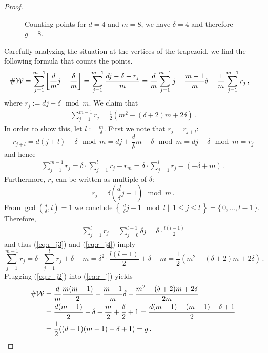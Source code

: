 \documentclass[main.tex]{subfiles}
\begin{document}
\begin{proof}
      \begin{figure}[H]
      \begin{center}
	  
      \end{center}
    \caption{Counting points for $d =4$ and $m = 8$, we have $\delta = 4$ and therefore $g = 8$.} 
    \label{fig:holom_diff}
\end{figure}
     Carefully analyzing the situation at the vertices of the trapezoid, we find the following formula that counts the points.
     \begin{align}\label{eq:r_j}
	\#\W & = \sum_{j = 1}^{m-1} \floor*{\frac{d}{m}j - \frac{\delta}{m}} = \sum_{j = 1}^{m-1} \frac{dj-\delta-r_j}{m} =
	 \frac{d}{m} \sum_{j=1}^{m-1} j - \frac{m-1}{m}\delta - \frac{1}{m} \sum_{j=1}^{m-1} r_j\,,
     \end{align}
      where $r_j := dj - \delta \, \bmod m$. \abstand
      We claim that
      \begin{align}\label{eq:r_j2}
       \sum_{j=1}^{m-1} r_j = \frac{1}{2}(m^2 - (\delta+2)m + 2\delta)\,.
      \end{align}
      In order to show this, let $l := \frac{m}{\delta}$. First we note that $r_j = r_{j+l}$:
      $$r_{j+l} = d(j+l) - \delta \, \bmod m = dj + \frac{d}{\delta}m - \delta \, \bmod m =  dj - \delta \, \bmod m =  r_j$$
      and hence 
      \begin{align}\label{eq:r_j3}
       \sum_{j=1}^{m-1} r_j = \delta \cdot \sum_{j=1}^{l} r_j - r_m = \delta \cdot \sum_{j=1}^{l} r_j - (-\delta + m)\,.
      \end{align}
      Furthermore, $r_j$ can be written as multiple of $\delta$:
      $$r_j = \delta \left(\frac{d}{\delta}j - 1\right) \, \bmod m\,.$$
      From $\gcd(\frac{d}{\delta},l) = 1$ we conclude $\left\{ \, \frac{d}{\delta}j - 1 \, \bmod l  \mid \, 1 \le j \le l \, \right\} = \{ \, 0,\dots,l-1 \, \}$.
      Therefore,  
      \begin{align}\label{eq:r_j4}
       \sum_{j = 1}^l r_j = \sum_{j = 0}^{l-1} \delta j = \delta \cdot \frac{l(l-1)}{2}
      \end{align}
      and thus (\ref{eq:r_j3}) and (\ref{eq:r_j4}) imply
      $$\sum_{j=1}^{m-1} r_j = \delta \cdot \sum_{j=1}^{l} r_j + \delta - m = \delta^2 \cdot \frac{l(l-1)}{2} + \delta - m = \frac{1}{2}(m^2 - (\delta+2)m + 2\delta)\,.$$
      Plugging (\ref{eq:r_j2}) into (\ref{eq:r_j}) yields
      \begin{align*}
	\#\mathcal{W} & = \frac{d}{m}\frac{m(m-1)}{2} - \frac{m-1}{m}\delta - \frac{m^2 - (\delta+2)m + 2\delta}{2m} \\
	       & = \frac{d(m-1)}{2} - \delta  - \frac{m}{2} + \frac{\delta}{2} + 1 =  \frac{d(m-1) - (m-1) - \delta + 1}{2} \\
	       & = \frac{1}{2}((d-1)(m-1)-\delta+1) = g\,.
      \end{align*}
     \end{proof}
\end{document}

